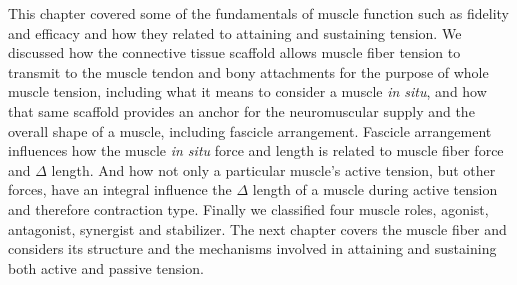 This chapter covered some of the fundamentals of muscle function such as fidelity and efficacy and how they related to attaining and sustaining tension. We discussed how the connective tissue scaffold allows muscle fiber tension to transmit to the muscle tendon and bony attachments for the purpose of whole muscle tension, including what it means to consider a muscle \textit{in situ}, and how that same scaffold provides an anchor for the neuromuscular supply and the overall shape of a muscle, including fascicle arrangement. Fascicle arrangement influences how the muscle \textit{in situ} force and length is related to muscle fiber force and $\Delta$ length. And how not only a particular muscle’s active tension, but other forces, have an integral influence the $\Delta$ length of a muscle during active tension and therefore contraction type. Finally we classified four muscle roles, agonist, antagonist, synergist and stabilizer. The next chapter covers the muscle fiber and considers its structure and the mechanisms involved in attaining and sustaining both active and passive tension.

\printbibliography[heading=subbibintoc]


